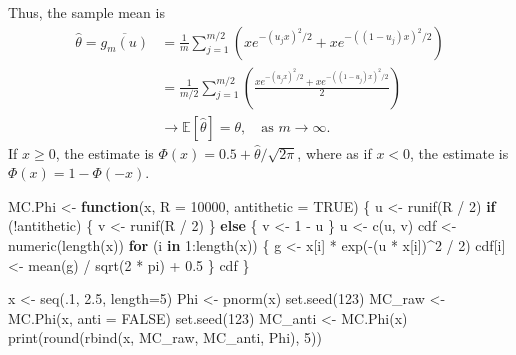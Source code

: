 \documentclass[
  letterpaper,
  DIV=11,
  numbers=noendperiod]{scrreprt}
\newenvironment{Shaded}{\begin{snugshade}}{\end{snugshade}}
\newcommand{\AttributeTok}[1]{\textcolor[rgb]{0.40,0.45,0.13}{#1}}
\newcommand{\ConstantTok}[1]{\textcolor[rgb]{0.56,0.35,0.01}{#1}}
\newcommand{\ControlFlowTok}[1]{\textcolor[rgb]{0.00,0.23,0.31}{\textbf{#1}}}
\newcommand{\DecValTok}[1]{\textcolor[rgb]{0.68,0.00,0.00}{#1}}
\newcommand{\FloatTok}[1]{\textcolor[rgb]{0.68,0.00,0.00}{#1}}
\newcommand{\FunctionTok}[1]{\textcolor[rgb]{0.28,0.35,0.67}{#1}}
\newcommand{\NormalTok}[1]{\textcolor[rgb]{0.00,0.23,0.31}{#1}}
\newcommand{\OtherTok}[1]{\textcolor[rgb]{0.00,0.23,0.31}{#1}}
\newcommand{\SpecialCharTok}[1]{\textcolor[rgb]{0.37,0.37,0.37}{#1}}
\begin{document}
Thus, the sample mean is \[
\begin{aligned}
\hat{\theta}=\overline{g_m(u)} & =\frac{1}{m} \sum_{j=1}^{m / 2}\left(x e^{-\left(u_j x\right)^2 / 2}+x e^{-\left(\left(1-u_j\right) x\right)^2 / 2}\right) \\
& =\frac{1}{m / 2} \sum_{j=1}^{m / 2}\left(\frac{x e^{-\left(u_j x\right)^2 / 2}+x e^{-\left(\left(1-u_j\right) x\right)^2 / 2}}{2}\right)\\
& \to \mathbb{E}[\hat{\theta}] = \theta, \quad \text{as } m\to\infty.
\end{aligned}
\] If \(x\ge 0\), the estimate is
\(\Phi(x) = 0.5 + \hat{\theta}/ \sqrt{2\pi}\), where as if \(x< 0\), the
estimate is \(\Phi(x) = 1-\Phi(-x)\).

\begin{Shaded}
\begin{Highlighting}[]
\NormalTok{MC.Phi }\OtherTok{\textless{}{-}} \ControlFlowTok{function}\NormalTok{(x, }\AttributeTok{R =} \DecValTok{10000}\NormalTok{, }\AttributeTok{antithetic =} \ConstantTok{TRUE}\NormalTok{) \{}
\NormalTok{  u }\OtherTok{\textless{}{-}} \FunctionTok{runif}\NormalTok{(R }\SpecialCharTok{/} \DecValTok{2}\NormalTok{)}
  \ControlFlowTok{if}\NormalTok{ (}\SpecialCharTok{!}\NormalTok{antithetic) \{}
\NormalTok{    v }\OtherTok{\textless{}{-}} \FunctionTok{runif}\NormalTok{(R }\SpecialCharTok{/} \DecValTok{2}\NormalTok{)}
\NormalTok{  \} }\ControlFlowTok{else}\NormalTok{ \{}
\NormalTok{    v }\OtherTok{\textless{}{-}} \DecValTok{1} \SpecialCharTok{{-}}\NormalTok{ u}
\NormalTok{  \}}
\NormalTok{  u }\OtherTok{\textless{}{-}} \FunctionTok{c}\NormalTok{(u, v)}
\NormalTok{  cdf }\OtherTok{\textless{}{-}} \FunctionTok{numeric}\NormalTok{(}\FunctionTok{length}\NormalTok{(x))}
  \ControlFlowTok{for}\NormalTok{ (i }\ControlFlowTok{in} \DecValTok{1}\SpecialCharTok{:}\FunctionTok{length}\NormalTok{(x)) \{}
\NormalTok{    g }\OtherTok{\textless{}{-}}\NormalTok{ x[i] }\SpecialCharTok{*} \FunctionTok{exp}\NormalTok{(}\SpecialCharTok{{-}}\NormalTok{(u }\SpecialCharTok{*}\NormalTok{ x[i])}\SpecialCharTok{\^{}}\DecValTok{2} \SpecialCharTok{/} \DecValTok{2}\NormalTok{)}
\NormalTok{    cdf[i] }\OtherTok{\textless{}{-}} \FunctionTok{mean}\NormalTok{(g) }\SpecialCharTok{/} \FunctionTok{sqrt}\NormalTok{(}\DecValTok{2} \SpecialCharTok{*}\NormalTok{ pi) }\SpecialCharTok{+} \FloatTok{0.5}
\NormalTok{  \}}
\NormalTok{  cdf}
\NormalTok{\}}

\NormalTok{x }\OtherTok{\textless{}{-}} \FunctionTok{seq}\NormalTok{(.}\DecValTok{1}\NormalTok{, }\FloatTok{2.5}\NormalTok{, }\AttributeTok{length=}\DecValTok{5}\NormalTok{)}
\NormalTok{Phi }\OtherTok{\textless{}{-}} \FunctionTok{pnorm}\NormalTok{(x)}
\FunctionTok{set.seed}\NormalTok{(}\DecValTok{123}\NormalTok{)}
\NormalTok{MC\_raw }\OtherTok{\textless{}{-}} \FunctionTok{MC.Phi}\NormalTok{(x, }\AttributeTok{anti =} \ConstantTok{FALSE}\NormalTok{)}
\FunctionTok{set.seed}\NormalTok{(}\DecValTok{123}\NormalTok{)}
\NormalTok{MC\_anti }\OtherTok{\textless{}{-}} \FunctionTok{MC.Phi}\NormalTok{(x)}
\FunctionTok{print}\NormalTok{(}\FunctionTok{round}\NormalTok{(}\FunctionTok{rbind}\NormalTok{(x, MC\_raw, MC\_anti, Phi), }\DecValTok{5}\NormalTok{))}
\end{Highlighting}
\end{Shaded}
\end{document}
